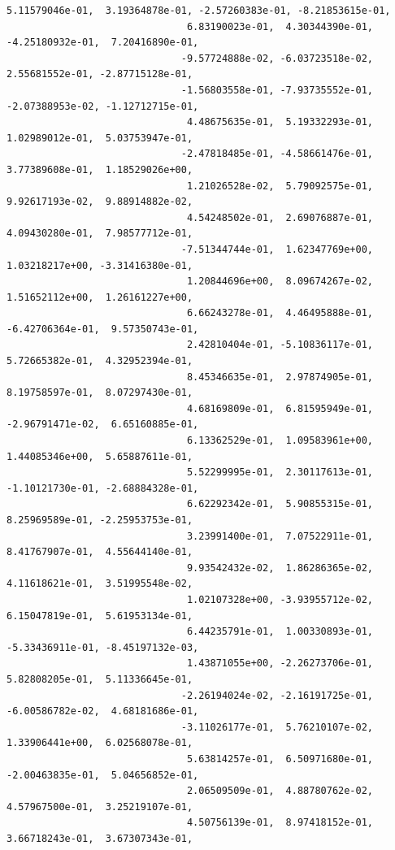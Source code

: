 \documentclass[11pt]{article}
\begin{document}
\begin{Verbatim}[commandchars=\\\{\}]
                               5.11579046e-01,  3.19364878e-01, -2.57260383e-01, -8.21853615e-01,
                               6.83190023e-01,  4.30344390e-01, -4.25180932e-01,  7.20416890e-01,
                              -9.57724888e-02, -6.03723518e-02,  2.55681552e-01, -2.87715128e-01,
                              -1.56803558e-01, -7.93735552e-01, -2.07388953e-02, -1.12712715e-01,
                               4.48675635e-01,  5.19332293e-01,  1.02989012e-01,  5.03753947e-01,
                              -2.47818485e-01, -4.58661476e-01,  3.77389608e-01,  1.18529026e+00,
                               1.21026528e-02,  5.79092575e-01,  9.92617193e-02,  9.88914882e-02,
                               4.54248502e-01,  2.69076887e-01,  4.09430280e-01,  7.98577712e-01,
                              -7.51344744e-01,  1.62347769e+00,  1.03218217e+00, -3.31416380e-01,
                               1.20844696e+00,  8.09674267e-02,  1.51652112e+00,  1.26161227e+00,
                               6.66243278e-01,  4.46495888e-01, -6.42706364e-01,  9.57350743e-01,
                               2.42810404e-01, -5.10836117e-01,  5.72665382e-01,  4.32952394e-01,
                               8.45346635e-01,  2.97874905e-01,  8.19758597e-01,  8.07297430e-01,
                               4.68169809e-01,  6.81595949e-01, -2.96791471e-02,  6.65160885e-01,
                               6.13362529e-01,  1.09583961e+00,  1.44085346e+00,  5.65887611e-01,
                               5.52299995e-01,  2.30117613e-01, -1.10121730e-01, -2.68884328e-01,
                               6.62292342e-01,  5.90855315e-01,  8.25969589e-01, -2.25953753e-01,
                               3.23991400e-01,  7.07522911e-01,  8.41767907e-01,  4.55644140e-01,
                               9.93542432e-02,  1.86286365e-02,  4.11618621e-01,  3.51995548e-02,
                               1.02107328e+00, -3.93955712e-02,  6.15047819e-01,  5.61953134e-01,
                               6.44235791e-01,  1.00330893e-01, -5.33436911e-01, -8.45197132e-03,
                               1.43871055e+00, -2.26273706e-01,  5.82808205e-01,  5.11336645e-01,
                              -2.26194024e-02, -2.16191725e-01, -6.00586782e-02,  4.68181686e-01,
                              -3.11026177e-01,  5.76210107e-02,  1.33906441e+00,  6.02568078e-01,
                               5.63814257e-01,  6.50971680e-01, -2.00463835e-01,  5.04656852e-01,
                               2.06509509e-01,  4.88780762e-02,  4.57967500e-01,  3.25219107e-01,
                               4.50756139e-01,  8.97418152e-01,  3.66718243e-01,  3.67307343e-01,

\end{Verbatim}
\end{document}
